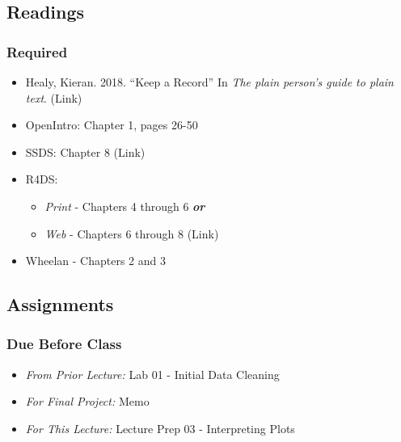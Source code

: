\documentclass[]{book}
\providecommand{\tightlist}{%
  \setlength{\itemsep}{0pt}\setlength{\parskip}{0pt}}
\theoremstyle{definition}
\theoremstyle{definition}
\theoremstyle{definition}
\theoremstyle{remark}
\begin{document}
\hypertarget{readings-4}{%
\subsection*{Readings}\label{readings-4}}

\hypertarget{required-4}{%
\subsubsection*{Required}\label{required-4}}

\begin{itemize}
\tightlist
\item
  Healy, Kieran. 2018. ``Keep a Record'' In \emph{The plain person's
  guide to plain text}. (Link)
\item
  OpenIntro: Chapter 1, pages 26-50
\item
  SSDS: Chapter 8 (Link)
\item
  R4DS:

  \begin{itemize}
  \tightlist
  \item
    \emph{Print} - Chapters 4 through 6 \textbf{\emph{or}}
  \item
    \emph{Web} - Chapters 6 through 8 (Link)
  \end{itemize}
\item
  Wheelan - Chapters 2 and 3
\end{itemize}

\hypertarget{assignments-4}{%
\subsection*{Assignments}\label{assignments-4}}

\hypertarget{due-before-class-2}{%
\subsubsection*{Due Before Class}\label{due-before-class-2}}

\begin{itemize}
\tightlist
\item
  \emph{From Prior Lecture:} Lab 01 - Initial Data Cleaning
\item
  \emph{For Final Project:} Memo
\item
  \emph{For This Lecture:} Lecture Prep 03 - Interpreting Plots
\end{itemize}
\end{document}
